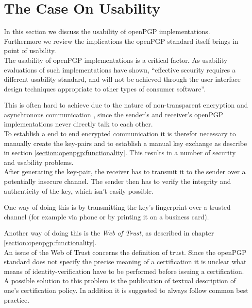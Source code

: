 
\section{The Case On Usability} \label{section:concerns:usability}

In this section we discuss the usability of openPGP implementations. Furthermore we review the implications the openPGP standard itself brings in point of usability. \\


The usability of openPGP implementations is a critical factor. As usability evaluations of such implementations \cite{Whitten1999} have shown, ``effective security requires a different usability standard, and will not be achieved through the user interface design techniques appropriate to other types of consumer software''.

This is often hard to achieve due to the nature of non-transparent encryption and asynchronous communication \citep[section 2.1]{RFC4880}, since the sender's and receiver's openPGP implementations never directly talk to each other. \\

To establish a end to end encrypted communication it is therefor necessary to manually create the key-pairs and to establish a manual key exchange as describe in section \ref{section:openpgp:functionality}. This results in a number of security and usability problems.  \\


After generating the key-pair, the receiver has to transmit it to the sender over a potentially insecure channel. The sender then has to verify the integrity and authenticity of the key, which isn't easily possible.

One way of doing this is by transmitting the key's fingerprint over a trusted channel (for example via phone or by printing it on a business card). 

Another way of doing this is the \textit{Web of Trust}, as described in chapter \ref{section:openpgp:functionality}. \\

An issue of the Web of Trust concerns the definition of trust. Since the openPGP standard does not specify the precise meaning of a certification it is unclear what means of identity-verification have to be performed before issuing a certification. A possible solution to this problem is the publication of textual description of one's certification policy. In addition it is suggested to always follow common best practice.   \\

